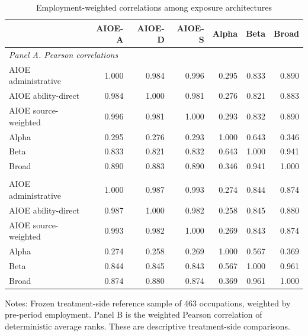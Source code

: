 \begin{table}[htbp]
\centering
\caption{Employment-weighted correlations among exposure architectures}
\label{tab:app-corr}
\small
\begin{threeparttable}
\begin{tabular}{lrrrrrr}
\toprule
 & AIOE-A & AIOE-D & AIOE-S & Alpha & Beta & Broad\\
\midrule
\multicolumn{7}{l}{\emph{Panel A. Pearson correlations}}\\
AIOE administrative &1.000&0.984&0.996&0.295&0.833&0.890\\
AIOE ability-direct &0.984&1.000&0.981&0.276&0.821&0.883\\
AIOE source-weighted &0.996&0.981&1.000&0.293&0.832&0.890\\
Alpha &0.295&0.276&0.293&1.000&0.643&0.346\\
Beta &0.833&0.821&0.832&0.643&1.000&0.941\\
Broad &0.890&0.883&0.890&0.346&0.941&1.000\\
\addlinespace
\multicolumn{7}{l}{\emph{Panel B. Average-rank correlations}}\\
AIOE administrative &1.000&0.987&0.993&0.274&0.844&0.874\\
AIOE ability-direct &0.987&1.000&0.982&0.258&0.845&0.880\\
AIOE source-weighted &0.993&0.982&1.000&0.269&0.843&0.874\\
Alpha &0.274&0.258&0.269&1.000&0.567&0.369\\
Beta &0.844&0.845&0.843&0.567&1.000&0.961\\
Broad &0.874&0.880&0.874&0.369&0.961&1.000\\
\bottomrule
\end{tabular}
\begin{tablenotes}[flushleft]\footnotesize
\item Notes: Frozen treatment-side reference sample of 463 occupations, weighted by pre-period employment. Panel B is the weighted Pearson correlation of deterministic average ranks. These are descriptive treatment-side comparisons.
\end{tablenotes}
\end{threeparttable}
\end{table}

